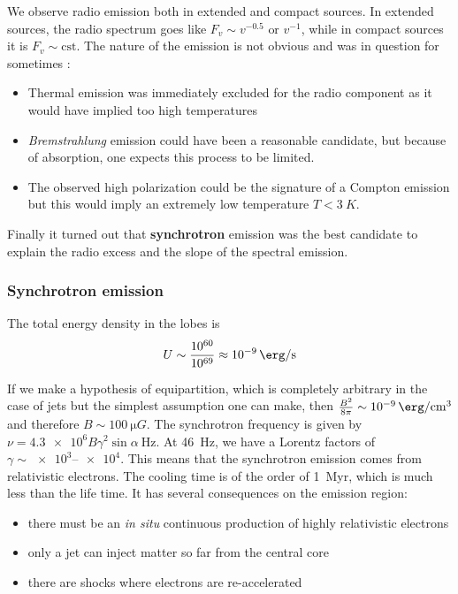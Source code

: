 \documentclass[10pt,a4paper,english]{article}
\begin{document}
We observe radio emission both in extended and compact sources. In extended
sources, the radio spectrum goes like $F_v \sim v^{-0.5} \textrm{ or } v^{-1}$,
while in compact sources it is $F_v \sim \mathrm{cst}$. The nature of the
emission is not obvious and was in question for sometimes :
\begin{itemize}
    \item Thermal emission was immediately excluded for the radio component as
          it would have implied too high temperatures
    \item \emph{Bremstrahlung} emission could have been a reasonable candidate,
          but because of absorption, one expects this process to be limited.
    \item The observed high polarization could be the signature of a Compton
          emission but this would imply an extremely low temperature $T <
          \SI{3}{K}$.
\end{itemize}

Finally it turned out that \textbf{synchrotron} emission was the best candidate
to explain the radio excess and the slope of the spectral emission.

\subsubsection{Synchrotron emission}

The total energy density in the lobes is
\begin{equation}
    U \sim \frac{10^{60}}{10^{69}} \approx \SI{e-9}{\erg\per\s}
\end{equation}

If we make a hypothesis of equipartition, which is completely arbitrary in the
case of jets but the simplest assumption one can make, then $\frac{B^2}{8\pi}
\sim \SI{e-9}{\erg\per\cm\cubed}$ and therefore $B \sim \SI{100}{\micro G}$.
The synchrotron frequency is given by $\nu = \num{4.3e6} B\gamma^2 \sin\alpha\
\si{\Hz}$. At \SI{46}{Hz}, we have a Lorentz factors of $\gamma \sim
\numrange{e3}{e4}$. This means that the synchrotron emission comes from
relativistic electrons. The cooling time is of the order of \SI{1}{Myr}, which
is much less than the life time. It has several consequences on the emission
region:
\begin{itemize}
    \item there must be an \emph{in situ} continuous production of highly
          relativistic electrons
    \item only a jet can inject matter so far from the central core
    \item there are shocks where electrons are re-accelerated
\end{itemize}
\end{document}
